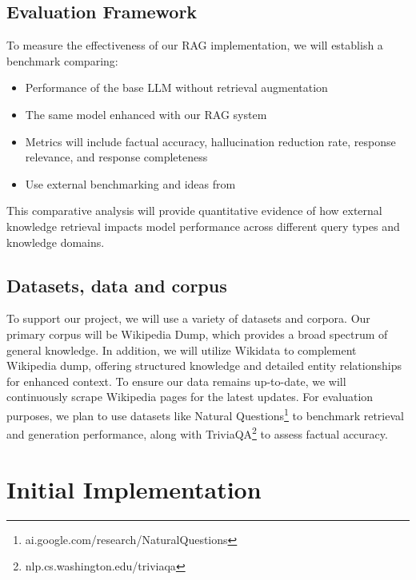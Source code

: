 \documentclass[fleqn,moreauthors,10pt]{ds_report}
\begin{document}
\subsection*{Evaluation Framework}
To measure the effectiveness of our RAG implementation, we will establish a benchmark comparing:

\begin{itemize}[itemsep=0em]
\item Performance of the base LLM without retrieval augmentation
\item The same model enhanced with our RAG system
\item Metrics will include factual accuracy, hallucination reduction rate, response relevance, and response completeness
\item Use external benchmarking and ideas from \cite{chen} 
\end{itemize}

This comparative analysis will provide quantitative evidence of how external knowledge retrieval impacts model performance across different query types and knowledge domains.

\subsection*{Datasets, data and corpus}
To support our project, we will use a variety of datasets and corpora. Our primary corpus will be Wikipedia Dump, which provides a broad spectrum of general knowledge. In addition, we will utilize Wikidata to complement Wikipedia dump, offering structured knowledge and detailed entity relationships for enhanced context. To ensure our data remains up-to-date, we will continuously scrape Wikipedia pages for the latest updates. For evaluation purposes, we plan to use datasets like Natural Questions\footnote{ai.google.com/research/NaturalQuestions} to benchmark retrieval and generation performance, along with TriviaQA\footnote{nlp.cs.washington.edu/triviaqa} to assess factual accuracy.  


\section*{Initial Implementation}
\end{document}
